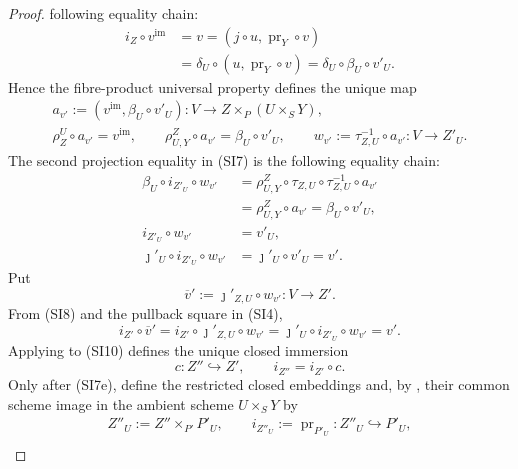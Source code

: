 \begin{proof}
  following equality chain:
  \[
  \begin{aligned}
    i_Z\circ v^{\mathrm{im}}
      &=v
       =(j\circ u,\operatorname{pr}_Y\circ v)\\
      &=\delta_U\circ(u,\operatorname{pr}_Y\circ v)
       =\delta_U\circ\beta_U\circ v'_U.
  \end{aligned}                                                     \tag{SI7b}
  \]
  Hence the fibre-product universal property defines the unique map
  \[
  \begin{gathered}
    a_{v'}:=(v^{\mathrm{im}},\beta_U\circ v'_U)
      \colon V\to Z\times_P(U\times_SY),\\
    \rho_Z^U\circ a_{v'}=v^{\mathrm{im}},
    \qquad
    \rho_{U,Y}^Z\circ a_{v'}=\beta_U\circ v'_U,
    \qquad
    w_{v'}:=\tau_{Z,U}^{-1}\circ a_{v'}\colon V\to Z'_U.
  \end{gathered}                                                    \tag{SI8a}
  \]
  The second projection equality in \textup{(SI7)} is the following equality
  chain:
  \[
  \begin{aligned}
    \beta_U\circ i_{Z'_U}\circ w_{v'}
      &=\rho_{U,Y}^Z\circ\tau_{Z,U}\circ\tau_{Z,U}^{-1}\circ a_{v'}\\
      &=\rho_{U,Y}^Z\circ a_{v'}
       =\beta_U\circ v'_U,\\
    i_{Z'_U}\circ w_{v'}&=v'_U,\\
    \jmath'_U\circ i_{Z'_U}\circ w_{v'}
      &=\jmath'_U\circ v'_U=v'.
  \end{aligned}                                                     \tag{SI8}
  \]
  Put
  \[
    \overline v':=\jmath'_{Z,U}\circ w_{v'}\colon V\to Z'.       \tag{SI9}
  \]
  From \textup{(SI8)} and the pullback square in \textup{(SI4)},
  \[
    i_{Z'}\circ\overline v'
      =i_{Z'}\circ\jmath'_{Z,U}\circ w_{v'}
      =\jmath'_U\circ i_{Z'_U}\circ w_{v'}=v'.                    \tag{SI10}
  \]
  Applying  to
  \textup{(SI10)} defines the unique closed immersion
  \[
    c\colon Z''\hookrightarrow Z',
    \qquad
    i_{Z''}=i_{Z'}\circ c.                                        \tag{SI11}
  \]
  Only after (SI7e), define the restricted closed embeddings and, by
  , their common scheme image in the
  ambient scheme $U\times_SY$ by
  \[
  \begin{gathered}
    Z''_U:=Z''\times_{P'}P'_U,
    \qquad i_{Z''_U}:=\operatorname{pr}_{P'_U}\colon Z''_U\hookrightarrow P'_U,\\

\end{gathered}\]
\end{proof}
